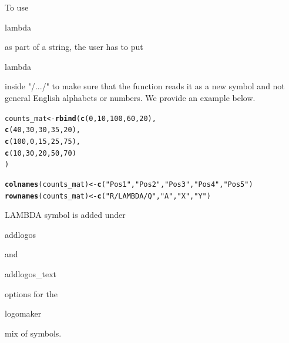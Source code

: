 \documentclass[12pt]{article}\usepackage[]{graphicx}\usepackage[usenames,dvipsnames]{color}
\makeatletter
\newcommand{\hlnum}[1]{\textcolor[rgb]{0.686,0.059,0.569}{#1}}%
\newcommand{\hlstr}[1]{\textcolor[rgb]{0.192,0.494,0.8}{#1}}%
\newcommand{\hlstd}[1]{\textcolor[rgb]{0.345,0.345,0.345}{#1}}%
\newcommand{\hlkwb}[1]{\textcolor[rgb]{0.69,0.353,0.396}{#1}}%
\newcommand{\hlkwd}[1]{\textcolor[rgb]{0.737,0.353,0.396}{\textbf{#1}}}%
\newenvironment{kframe}{%
 \def\at@end@of@kframe{}%
 \ifinner\ifhmode%
  \def\at@end@of@kframe{\end{minipage}}%
  \begin{minipage}{\columnwidth}%
 \fi\fi%
 \def\FrameCommand##1{\hskip\@totalleftmargin \hskip-\fboxsep
 \colorbox{shadecolor}{##1}\hskip-\fboxsep
     \hskip-\linewidth \hskip-\@totalleftmargin \hskip\columnwidth}%
 \MakeFramed {\advance\hsize-\width
   \@totalleftmargin\z@ \linewidth\hsize
   \@setminipage}}%
 {\par\unskip\endMakeFramed%
 \at@end@of@kframe}
\newenvironment{knitrout}{}{} %
\makeatother
\begin{document}
To use \begin{verb} lambda \end{verb} as part of a string, the user has to put \begin{verb} lambda \end{verb} inside "/.../" to make sure that the function reads it as a new symbol and not general English alphabets or numbers. We provide an example below.


\begin{knitrout}
\color{fgcolor}\begin{kframe}
\begin{alltt}
\hlstd{counts_mat} \hlkwb{<-} \hlkwd{rbind}\hlstd{(}\hlkwd{c}\hlstd{(}\hlnum{0}\hlstd{,} \hlnum{10}\hlstd{,} \hlnum{100}\hlstd{,} \hlnum{60}\hlstd{,} \hlnum{20}\hlstd{),}
                    \hlkwd{c}\hlstd{(}\hlnum{40}\hlstd{,} \hlnum{30}\hlstd{,} \hlnum{30}\hlstd{,} \hlnum{35}\hlstd{,} \hlnum{20}\hlstd{),}
                    \hlkwd{c}\hlstd{(}\hlnum{100}\hlstd{,} \hlnum{0}\hlstd{,} \hlnum{15}\hlstd{,} \hlnum{25}\hlstd{,} \hlnum{75}\hlstd{),}
                    \hlkwd{c}\hlstd{(}\hlnum{10}\hlstd{,} \hlnum{30}\hlstd{,} \hlnum{20}\hlstd{,} \hlnum{50}\hlstd{,} \hlnum{70}\hlstd{)}
\hlstd{)}

\hlkwd{colnames}\hlstd{(counts_mat)} \hlkwb{<-} \hlkwd{c}\hlstd{(}\hlstr{"Pos 1"}\hlstd{,} \hlstr{"Pos 2"}\hlstd{,} \hlstr{"Pos 3"}\hlstd{,} \hlstr{"Pos 4"}\hlstd{,} \hlstr{"Pos 5"}\hlstd{)}
\hlkwd{rownames}\hlstd{(counts_mat)} \hlkwb{<-} \hlkwd{c}\hlstd{(}\hlstr{"R/LAMBDA/Q"}\hlstd{,} \hlstr{"A"}\hlstd{,} \hlstr{"X"}\hlstd{,} \hlstr{"Y"}\hlstd{)}
\end{alltt}
\end{kframe}
\end{knitrout}

LAMBDA symbol is added under \begin{verb} addlogos \end{verb} and  \begin{verb} addlogos_text \end{verb} options for the \begin{verb} logomaker \end{verb} mix of symbols.
\end{document}
